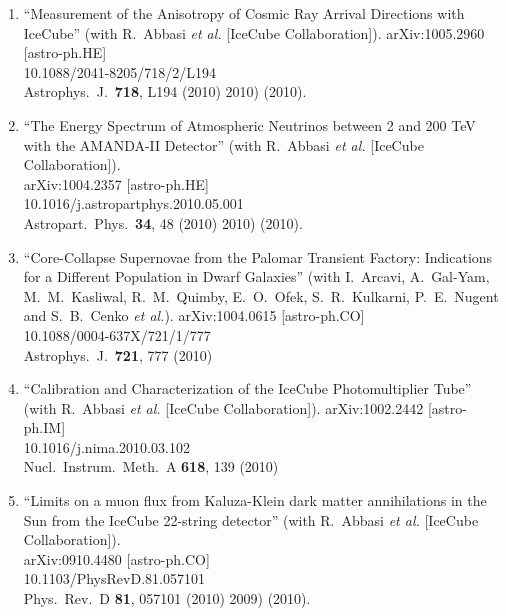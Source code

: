 \begin{enumerate}
\item ``Measurement of the Anisotropy of Cosmic Ray Arrival
        Directions with   IceCube'' (with R.~Abbasi {\it et
        al.}  [IceCube Collaboration]). arXiv:1005.2960
        [astro-ph.HE] \\{}10.1088/2041-8205/718/2/L194
        \\{}Astrophys.\ J.\ {\bf 718}, L194 (2010) %
        2010)  (2010).

\item ``The Energy Spectrum of Atmospheric Neutrinos between
        2 and 200 TeV   with the AMANDA-II Detector'' (with
        R.~Abbasi {\it et al.}  [IceCube
        Collaboration]).  \\{}arXiv:1004.2357 [astro-ph.HE]
        \\{}10.1016/j.astropartphys.2010.05.001
        \\{}Astropart.\ Phys.\ {\bf     34}, 48 (2010) %
        2010)  (2010).

\item ``Core-Collapse Supernovae from the Palomar Transient
        Factory:   Indications for a Different Population in
        Dwarf Galaxies'' (with I.~Arcavi, A.~Gal-Yam,
        M.~M.~Kasliwal, R.~M.~Quimby, E.~O.~Ofek,
        S.~R.~Kulkarni, P.~E.~Nugent and S.~B.~Cenko {\it et
        al.}). arXiv:1004.0615 [astro-ph.CO]
        \\{}10.1088/0004-637X/721/1/777   \\{}Astrophys.\
        J.\ {\bf 721}, 777 (2010) %

\item ``Calibration and Characterization of the IceCube
        Photomultiplier   Tube'' (with R.~Abbasi {\it et
        al.}  [IceCube Collaboration]). arXiv:1002.2442
        [astro-ph.IM] \\{}10.1016/j.nima.2010.03.102
        \\{}Nucl.\ Instrum.\ Meth.\ A {\bf 618}, 139 (2010)

\item ``Limits on a muon flux from Kaluza-Klein dark matter
        annihilations in   the Sun from the IceCube
        22-string detector'' (with R.~Abbasi {\it et
        al.}  [IceCube Collaboration]).  \\{}arXiv:0910.4480
        [astro-ph.CO]   \\{}10.1103/PhysRevD.81.057101
        \\{}Phys.\ Rev.\ D {\bf 81}, 057101   (2010) %
        2009)  (2010).


\end{enumerate}
